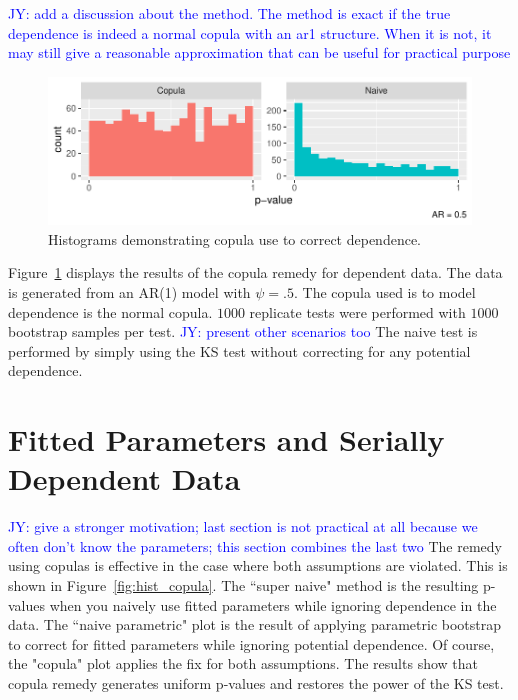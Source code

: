 \documentclass[12pt, letterpaper, titlepage]{article}
\newcommand{\jy}[1]{\textcolor{blue}{JY: #1}}
\begin{document}
\jy{add a discussion about the method. The method is exact if the true
  dependence is indeed a normal copula with an ar1 structure. When it is not, it
  may still give a reasonable approximation that can be useful for practical purpose}

\begin{figure}[tbp]
  \centering
  \includegraphics{hist_copula_only}
  \caption{Histograms demonstrating copula use to correct dependence.}
  \label{fig:hist_copula_only}
\end{figure}

Figure~\ref{fig:hist_copula_only} displays the results of the copula remedy for dependent data.
The data is generated from an AR(1) model with $\psi = .5$. The copula used is to model
dependence is the normal copula. $1000$ replicate tests were performed with
$1000$ bootstrap samples per test.
\jy{present other scenarios too}
The naive test is performed by simply using the KS test without correcting for any 
potential dependence.


\section{Fitted Parameters and Serially Dependent Data}\label{sec:fittedwithdependence}

\jy{give a stronger motivation; last section is not practical at all because we
  often don't know the parameters; this section combines the last two}
The remedy using copulas is effective in the case where both assumptions are violated.
This is shown in Figure~\ref{fig:hist_copula}. The ``super naive" method is the resulting 
p-values when you naively use fitted parameters while ignoring dependence in the data.
The ``naive parametric" plot is the result of applying parametric bootstrap to correct
for fitted parameters while ignoring potential dependence. Of course, the "copula" 
plot applies the fix for both assumptions. The results show that copula remedy generates 
uniform p-values and restores the power of the KS test.
\end{document}
